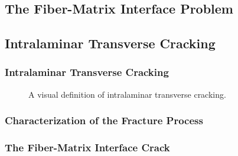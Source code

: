 \documentclass[first,firstsupp,lastsupp,handout,last,hyperref,table]{ETHclass}
\begin{document}
\subsection{The Fiber-Matrix Interface Problem}

\subsection{Intralaminar Transverse Cracking}

\begin{frame}
\frametitle{Intralaminar Transverse Cracking}
\vspace{-0.75cm}
\centering
\captionsetup[subfigure]{labelfont=footnotesize}
\begin{figure}[!h]
\centering
{}\quad
{}
 \caption{A visual definition of intralaminar transverse cracking.}
  \label{fig:intralaminar-cracks}
\end{figure}
\end{frame}

\begin{frame}
\frametitle{Characterization of the Fracture Process}
\vspace{-0.5cm}
\centering

\end{frame}

\begin{frame}
\frametitle{The Fiber-Matrix Interface Crack}
\vspace{-0.5cm}
\centering

\end{frame}
\end{document}
